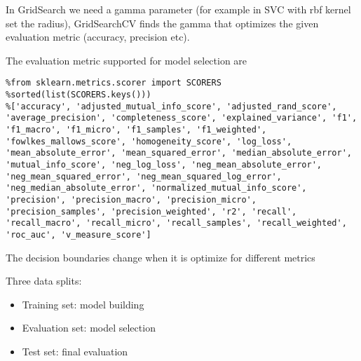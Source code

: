 \documentclass[12pt]{report}
\begin{document}
In GridSearch we need a gamma parameter (for example in SVC with rbf kernel set the radius), GridSearchCV finds the gamma that optimizes the given evaluation metric (accuracy, precision etc).


The evaluation metric supported for model selection are
\begin{lstlisting}
%from sklearn.metrics.scorer import SCORERS
%sorted(list(SCORERS.keys()))
%['accuracy', 'adjusted_mutual_info_score', 'adjusted_rand_score', 'average_precision', 'completeness_score', 'explained_variance', 'f1', 'f1_macro', 'f1_micro', 'f1_samples', 'f1_weighted', 'fowlkes_mallows_score', 'homogeneity_score', 'log_loss', 'mean_absolute_error', 'mean_squared_error', 'median_absolute_error', 'mutual_info_score', 'neg_log_loss', 'neg_mean_absolute_error', 'neg_mean_squared_error', 'neg_mean_squared_log_error', 'neg_median_absolute_error', 'normalized_mutual_info_score', 'precision', 'precision_macro', 'precision_micro', 'precision_samples', 'precision_weighted', 'r2', 'recall', 'recall_macro', 'recall_micro', 'recall_samples', 'recall_weighted', 'roc_auc', 'v_measure_score']
\end{lstlisting}
The decision boundaries change when it is optimize for different metrics

Three data splits:
\begin{itemize}
	\item Training set: model building
	\item Evaluation set: model selection 
	\item Test set: final evaluation
\end{itemize}
\end{document}
